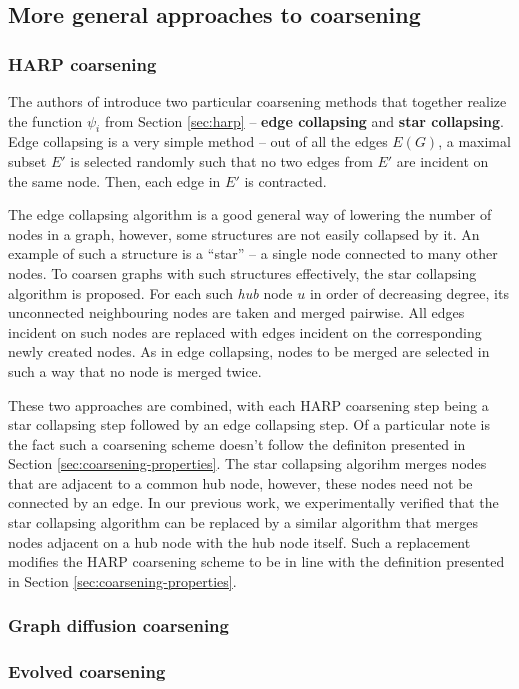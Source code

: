 \subsection{More general approaches to coarsening}\label{sec:coarsening-algorithms}

\subsubsection{HARP coarsening}\label{sec:harp-coarsening}

The authors of \cite{chen_harp_2018} introduce two particular coarsening methods that together realize the function \( \psi_i \) from Section \ref{sec:harp} -- \textbf{edge collapsing} and \textbf{star collapsing}. Edge collapsing is a very simple method -- out of all the edges \( E \left( G \right) \), a maximal subset \( E' \) is selected randomly such that no two edges from \( E' \) are incident on the same node. Then, each edge in \( E' \) is contracted.

The edge collapsing algorithm is a good general way of lowering the number of nodes in a graph, however, some structures are not easily collapsed by it. An example of such a structure is a \enquote{star} -- a single node connected to many other nodes. To coarsen graphs with such structures effectively, the star collapsing algorithm is proposed. For each such \textit{hub} node \( u \) in order of decreasing degree, its unconnected neighbouring nodes are taken and merged pairwise. All edges incident on such nodes are replaced with edges incident on the corresponding newly created nodes. As in edge collapsing, nodes to be merged are selected in such a way that no node is merged twice.

These two approaches are combined, with each HARP coarsening step being a star collapsing step followed by an edge collapsing step. Of a particular note is the fact such a coarsening scheme doesn't follow the definiton presented in Section \ref{sec:coarsening-properties}. The star collapsing algorihm merges nodes that are adjacent to a common hub node, however, these nodes need not be connected by an edge. In our previous work, we experimentally verified that the star collapsing algorithm can be replaced by a similar algorithm that merges nodes adjacent on a hub node with the hub node itself. Such a replacement modifies the HARP coarsening scheme to be in line with the definition presented in Section \ref{sec:coarsening-properties}.

\subsubsection{Graph diffusion coarsening}

\subsubsection{Evolved coarsening}
